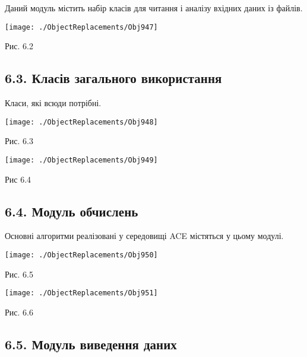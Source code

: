 Даний модуль містить набір класів для читання і аналізу вхідних даних із
файлів.

\texttt{[image: ./ObjectReplacements/Obj947]}

Рис. 6.2

\hypertarget{ux43aux43bux430ux441ux456ux432-ux437ux430ux433ux430ux43bux44cux43dux43eux433ux43e-ux432ux438ux43aux43eux440ux438ux441ux442ux430ux43dux43dux44f}{%
\subsection{6.3. Класів загального
використання}\label{ux43aux43bux430ux441ux456ux432-ux437ux430ux433ux430ux43bux44cux43dux43eux433ux43e-ux432ux438ux43aux43eux440ux438ux441ux442ux430ux43dux43dux44f}}

Класи, які всюди потрібні.

\texttt{[image: ./ObjectReplacements/Obj948]}

Рис. 6.3

\texttt{[image: ./ObjectReplacements/Obj949]}

Рис 6.4

\hypertarget{ux43cux43eux434ux443ux43bux44c-ux43eux431ux447ux438ux441ux43bux435ux43dux44c}{%
\subsection[6.4. Модуль
обчислень]{\texorpdfstring{\protect\hypertarget{anchor-70}{}{}6.4.
Модуль
обчислень}{6.4. Модуль обчислень}}\label{ux43cux43eux434ux443ux43bux44c-ux43eux431ux447ux438ux441ux43bux435ux43dux44c}}

Основні алгоритми реалізовані у середовищі ACE містяться у цьому модулі.

\texttt{[image: ./ObjectReplacements/Obj950]}

Рис. 6.5

\texttt{[image: ./ObjectReplacements/Obj951]}

Рис. 6.6

\hypertarget{ux43cux43eux434ux443ux43bux44c-ux432ux438ux432ux435ux434ux435ux43dux43dux44f-ux434ux430ux43dux438ux445}{%
\subsection[6.5. Модуль виведення
даних]{\texorpdfstring{\protect\hypertarget{anchor-71}{}{}6.5. Модуль
виведення
даних}{6.5. Модуль виведення даних}}\label{ux43cux43eux434ux443ux43bux44c-ux432ux438ux432ux435ux434ux435ux43dux43dux44f-ux434ux430ux43dux438ux445}}

